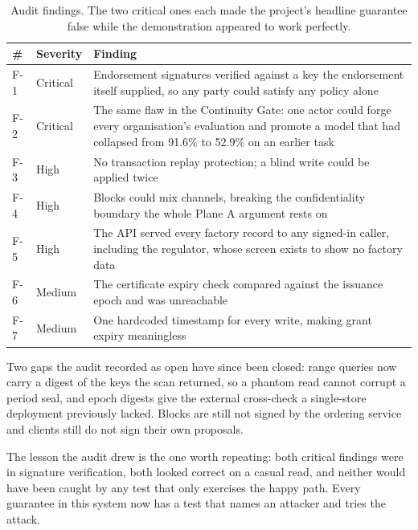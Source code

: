 \begin{table}[htbp]
\centering
\caption{Audit findings. The two critical ones each made the project's headline
guarantee false while the demonstration appeared to work perfectly.}
\label{tab:audit}
\small
\begin{tabularx}{\textwidth}{@{}l l Y@{}}
\toprule
\textbf{\#} & \textbf{Severity} & \textbf{Finding} \\
\midrule
F-1 & Critical & Endorsement signatures verified against a key the endorsement itself supplied, so any party could satisfy any policy alone \\
F-2 & Critical & The same flaw in the Continuity Gate: one actor could forge every organisation's evaluation and promote a model that had collapsed from 91.6\% to 52.9\% on an earlier task \\
F-3 & High & No transaction replay protection; a blind write could be applied twice \\
F-4 & High & Blocks could mix channels, breaking the confidentiality boundary the whole Plane A argument rests on \\
F-5 & High & The API served every factory record to any signed-in caller, including the regulator, whose screen exists to show no factory data \\
F-6 & Medium & The certificate expiry check compared against the issuance epoch and was unreachable \\
F-7 & Medium & One hardcoded timestamp for every write, making grant expiry meaningless \\
\bottomrule
\end{tabularx}
\end{table}

Two gaps the audit recorded as open have since been closed: range queries now
carry a digest of the keys the scan returned, so a phantom read cannot corrupt a
period seal, and epoch digests give the external cross-check a single-store
deployment previously lacked. Blocks are still not signed by the ordering service
and clients still do not sign their own proposals.

The lesson the audit drew is the one worth repeating: both critical findings were
in signature verification, both looked correct on a casual read, and neither would
have been caught by any test that only exercises the happy path. Every guarantee
in this system now has a test that names an attacker and tries the attack.

\small




